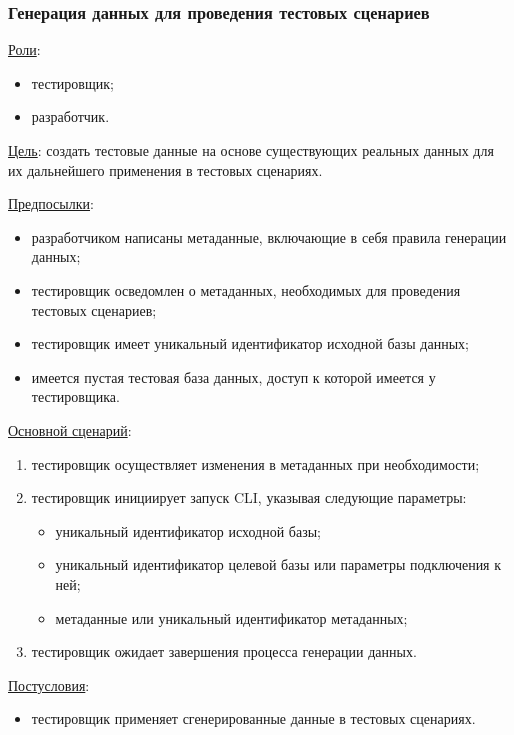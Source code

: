 \subsubsection{Генерация данных для проведения тестовых сценариев}

\underline{Роли}:

\begin{itemize}
    \item тестировщик;
    \item разработчик.
\end{itemize}

\underline{Цель}: создать тестовые данные на основе существующих реальных данных для их дальнейшего применения в тестовых сценариях.

\underline{Предпосылки}:

\begin{itemize}
    \item разработчиком написаны метаданные, включающие в себя правила генерации данных;
    \item тестировщик осведомлен о метаданных, необходимых для проведения тестовых сценариев;
    \item тестировщик имеет уникальный идентификатор исходной базы данных;
    \item имеется пустая тестовая база данных, доступ к которой имеется у тестировщика.
\end{itemize}

\underline{Основной сценарий}:

\begin{enumerate}
    \item тестировщик осуществляет изменения в метаданных при необходимости;
    \item тестировщик инициирует запуск CLI, указывая следующие параметры:
    \begin{itemize}
        \item уникальный идентификатор исходной базы;
        \item уникальный идентификатор целевой базы или параметры подключения к ней;
        \item метаданные или уникальный идентификатор метаданных;
    \end{itemize}
    \item тестировщик ожидает завершения процесса генерации данных.
\end{enumerate}

\underline{Постусловия}:

\begin{itemize}
    \item тестировщик применяет сгенерированные данные в тестовых сценариях.
\end{itemize}

